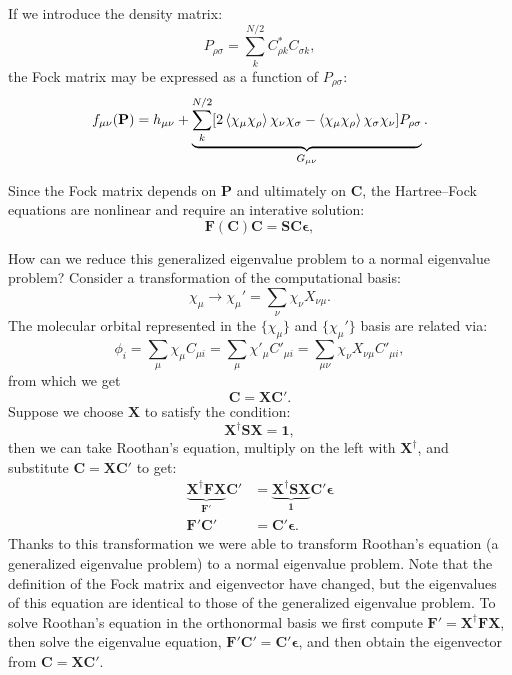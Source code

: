 \documentclass[../Main/chem532-notes.tex]{subfiles}
\begin{document}
If we introduce the density matrix:
\begin{equation}
P_{\rho\sigma} = \sum_k^{N/2} C_{\rho k}^* C_{\sigma k},
\end{equation}
the Fock matrix may be expressed as a function of $P_{\rho\sigma}$:
\begin{equation}
f_{\mu\nu}(\mathbf{P}) = h_{\mu\nu}
+\underbrace{
\sum_k^{N/2} [ 2 \braket{\chi_\mu \chi_\rho}{\chi_\nu \chi_\sigma} 
- \braket{\chi_\mu \chi_\rho}{\chi_\sigma \chi_\nu }] P_{\rho\sigma}
}_{G_{\mu\nu}}.
\end{equation}

Since the Fock matrix depends on $\mathbf{P}$ and ultimately on $\mathbf{C}$, the Hartree--Fock equations are nonlinear and require an interative solution:
\begin{equation}
 \mathbf{F}(\mathbf{C})\mathbf{C} = \mathbf{S}\mathbf{C}\boldsymbol{\epsilon},
\end{equation}

How can we reduce this generalized eigenvalue problem to a normal eigenvalue problem?
Consider a transformation of the computational basis:
\begin{equation}
\chi_\mu \rightarrow \chi_\mu' = \sum_\nu \chi_\nu X_{\nu\mu}.
\end{equation}
The molecular orbital represented in the $\{\chi_\mu\}$ and $\{\chi_\mu'\}$ basis are related via:
\begin{equation}
\phi_i = \sum_\mu \chi_\mu C_{\mu i} = \sum_\mu \chi'_\mu C'_{\mu i} = \sum_{\mu \nu} \chi_\nu X_{\nu\mu}  C'_{\mu i},
\end{equation}
from which we get
\begin{equation}
\mathbf{C} = \mathbf{XC}'.
\end{equation}
Suppose we choose $\mathbf{X}$ to satisfy the condition:
\begin{equation}
\mathbf{X}^\dagger \mathbf{SX} = \mathbf{1},
\end{equation}
then we can take Roothan's equation, multiply on the left with $\mathbf{X}^\dagger$, and substitute $\mathbf{C} = \mathbf{XC}'$ to get:
\begin{equation}
\begin{split}
\underbrace{\mathbf{X}^\dagger\mathbf{F}\mathbf{X}}_{\mathbf{F}'}\mathbf{C}' &= \underbrace{\mathbf{X}^\dagger\mathbf{S}\mathbf{X}}_{\mathbf{1}}\mathbf{C}'\boldsymbol{\epsilon} \\
\mathbf{F}'\mathbf{C}' &= \mathbf{C}'\boldsymbol{\epsilon}.
\end{split}
\end{equation}
Thanks to this transformation we were able to transform Roothan's equation (a generalized eigenvalue problem) to a normal eigenvalue problem.
Note that the definition of the Fock matrix and eigenvector have changed, but the eigenvalues of this equation are identical to those of the generalized eigenvalue problem.
To solve Roothan's equation in the orthonormal basis we first compute $\mathbf{F}' =\mathbf{X}^\dagger\mathbf{F}\mathbf{X}$, then solve the  eigenvalue equation, $\mathbf{F}'\mathbf{C}' = \mathbf{C}'\boldsymbol{\epsilon}$, and then obtain the eigenvector from $\mathbf{C} = \mathbf{XC}'$.
\end{document}
